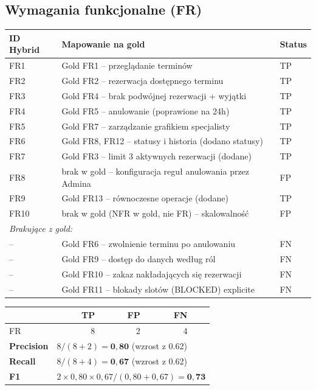 \documentclass[12pt,a4paper]{article}
\newcommand{\tp}[1]{\colorbox{tpcolor}{\small #1}}
\newcommand{\fp}[1]{\colorbox{fpcolor}{\small #1}}
\newcommand{\fn}[1]{\colorbox{fncolor}{\small #1}}
\begin{document}
\vspace{0.8em}

\subsection{Wymagania funkcjonalne (FR)}

\begin{tabular}{p{2.5cm} p{7cm} l}
\toprule
\textbf{ID Hybrid} & \textbf{Mapowanie na gold} & \textbf{Status} \\
\midrule
FR1 & Gold FR1 -- przeglądanie terminów & \tp{TP} \\
FR2 & Gold FR2 -- rezerwacja dostępnego terminu & \tp{TP} \\
FR3 & Gold FR4 -- brak podwójnej rezerwacji + wyjątki & \tp{TP} \\
FR4 & Gold FR5 -- anulowanie (poprawione na 24h) & \tp{TP} \\
FR5 & Gold FR7 -- zarządzanie grafikiem specjalisty & \tp{TP} \\
FR6 & Gold FR8, FR12 -- statusy i historia (dodano statusy) & \tp{TP} \\
FR7 & Gold FR3 -- limit 3 aktywnych rezerwacji (dodane) & \tp{TP} \\
FR8 & brak w gold -- konfiguracja reguł anulowania przez Admina & \fp{FP} \\
FR9 & Gold FR13 -- równoczesne operacje (dodane) & \tp{TP} \\
FR10 & brak w gold (NFR w gold, nie FR) -- skalowalność & \fp{FP} \\
\midrule
\multicolumn{3}{l}{\textit{Brakujące z gold:}} \\
-- & Gold FR6 -- zwolnienie terminu po anulowaniu & \fn{FN} \\
-- & Gold FR9 -- dostęp do danych według ról & \fn{FN} \\
-- & Gold FR10 -- zakaz nakładających się rezerwacji & \fn{FN} \\
-- & Gold FR11 -- blokady slotów (BLOCKED) explicite & \fn{FN} \\
\bottomrule
\end{tabular}

\vspace{0.5em}
\begin{tabular}{lrrrr}
\toprule
& \textbf{TP} & \textbf{FP} & \textbf{FN} & \\
\midrule
FR & 8 & 2 & 4 & \\
\midrule
\textbf{Precision} & \multicolumn{4}{l}{$8 / (8+2) = \mathbf{0{,}80}$ (wzrost z 0.62)} \\
\textbf{Recall}    & \multicolumn{4}{l}{$8 / (8+4) = \mathbf{0{,}67}$ (wzrost z 0.62)} \\
\textbf{F1}        & \multicolumn{4}{l}{$2 \times 0{,}80 \times 0{,}67 / (0{,}80+0{,}67) = \mathbf{0{,}73}$} \\
\bottomrule
\end{tabular}
\end{document}
